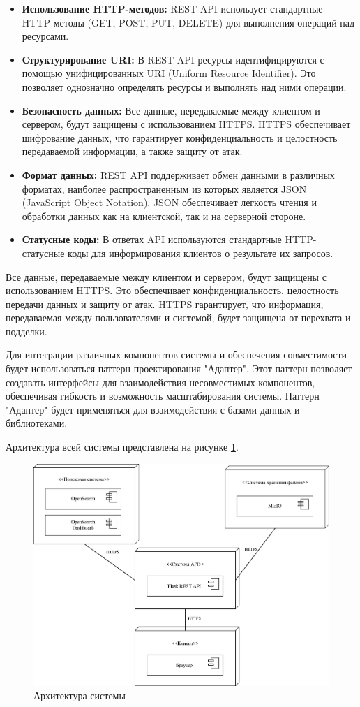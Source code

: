 \begin{itemize}
	\item \textbf{Использование HTTP-методов:} REST API использует стандартные HTTP-методы (GET, POST, PUT, DELETE) для выполнения операций над ресурсами.
	\item \textbf{Структурирование URI:} В REST API ресурсы идентифицируются с помощью унифицированных URI (Uniform Resource Identifier). Это позволяет однозначно определять ресурсы и выполнять над ними операции.
	\item \textbf{Безопасность данных:} Все данные, передаваемые между клиентом и сервером, будут защищены с использованием HTTPS. HTTPS обеспечивает шифрование данных, что гарантирует конфиденциальность и целостность передаваемой информации, а также защиту от атак.
	\item \textbf{Формат данных:} REST API поддерживает обмен данными в различных форматах, наиболее распространенным из которых является JSON (JavaScript Object Notation). JSON обеспечивает легкость чтения и обработки данных как на клиентской, так и на серверной стороне.
	\item \textbf{Статусные коды:} В ответах API используются стандартные HTTP-статусные коды для информирования клиентов о результате их запросов.
\end{itemize}

Все данные, передаваемые между клиентом и сервером, будут защищены с использованием HTTPS. Это обеспечивает конфиденциальность, целостность передачи данных и защиту от атак. HTTPS гарантирует, что информация, передаваемая между пользователями и системой, будет защищена от перехвата и подделки.

Для интеграции различных компонентов системы и обеспечения совместимости будет использоваться паттерн проектирования "Адаптер". Этот паттерн позволяет создавать интерфейсы для взаимодействия несовместимых компонентов, обеспечивая гибкость и возможность масштабирования системы. Паттерн "Адаптер" будет применяться для взаимодействия с базами данных и библиотеками.

Архитектура всей системы представлена на рисунке \ref{fig:-architecture}.
\begin{figure}
	\centering
	\includegraphics[width=0.9\linewidth]{"images/Архитектура-системы"}
	\caption{Архитектура системы}
	\label{fig:-architecture}
\end{figure}

